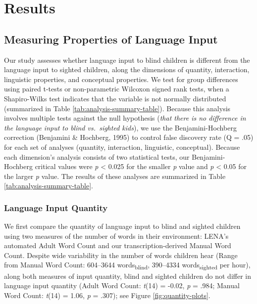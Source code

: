 \documentclass[
  man,floatsintext]{apa6}
\begin{document}
\hypertarget{results}{%
\section{Results}\label{results}}

\hypertarget{measuring-properties-of-language-input}{%
\subsection{Measuring Properties of Language Input}\label{measuring-properties-of-language-input}}

Our study assesses whether language input to blind children is different from the language input to sighted children, along the dimensions of quantity, interaction, linguistic properties, and conceptual properties. We test for group differences using paired t-tests or non-parametric Wilcoxon signed rank tests, when a Shapiro-Wilks test indicates that the variable is not normally distributed (summarized in Table \ref{tab:analysis-summary-table}). Because this analysis involves multiple tests against the null hypothesis (\emph{that there is no difference in the language input to blind vs.~sighted kids}), we use the Benjamini-Hochberg correction (Benjamini \& Hochberg, 1995) to control false discovery rate (Q = .05) for each set of analyses (quantity, interaction, linguistic, conceptual). Because each dimension's analysis consists of two statistical tests, our Benjamini-Hochberg critical values were \emph{p} \textless{} 0.025 for the smaller \emph{p} value and \emph{p} \textless{} 0.05 for the larger \emph{p} value. The results of these analyses are summarized in Table \ref{tab:analysis-summary-table}.

\hypertarget{language-input-quantity}{%
\subsubsection{Language Input Quantity}\label{language-input-quantity}}

We first compare the quantity of language input to blind and sighted children using two measures of the number of words in their environment: LENA's automated Adult Word Count and our transcription-derived Manual Word Count. Despite wide variability in the number of words children hear (Range from Manual Word Count: 604--3644 words\textsubscript{blind}, 390--4334 words\textsubscript{sighted} per hour), along both measures of input quantity, blind and sighted children do not differ in language input quantity (Adult Word Count: \emph{t}(14) = -0.02, \emph{p} = .984; Manual Word Count: \emph{t}(14) = 1.06, \emph{p} = .307); see Figure \ref{fig:quantity-plots}.
\end{document}
